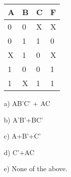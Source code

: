 \documentclass{article}
\begin{document}
\begin{enumerate}
\begin{tabular}{l|l|l||l}
A & B & C & F \\ \hline \hline
0 & 0 & X & X \\ \hline
0 & 1 & 1 & 0 \\ \hline
X & 1 & 0 & X \\ \hline
1 & 0 & 0 & 1 \\ \hline
1 & X & 1 & 1 \\ 
\end{tabular}
\begin{description} 
\item{a) } AB'C' + AC
\item{b) } A'B'+BC'
\item{c) } A+B'+C'
\item{d) } C'+AC
\item{e) } None of the above.
\end{description}


\end{enumerate}
\end{document}
